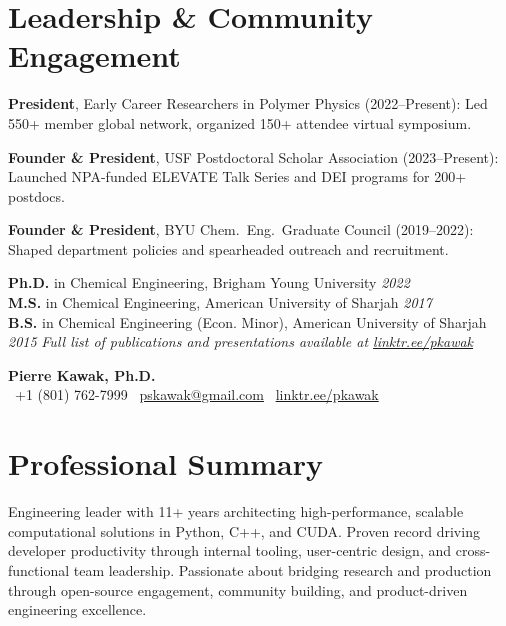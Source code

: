 \section*{Leadership \& Community Engagement}
\begin{tabitemize}[leftmargin=*]
  \item \textbf{President}, Early Career Researchers in Polymer Physics (2022–Present): Led 550+ member global network, organized 150+ attendee virtual symposium.
  \item \textbf{Founder \& President}, USF Postdoctoral Scholar Association (2023–Present): Launched NPA-funded ELEVATE Talk Series and DEI programs for 200+ postdocs.
  \item \textbf{Founder \& President}, BYU Chem.~Eng.~Graduate Council (2019–2022): Shaped department policies and spearheaded outreach and recruitment.
\end{tabitemize}
\textbf{Ph.D.} in Chemical Engineering, Brigham Young University \hfill \textit{2022} \\
\textbf{M.S.} in Chemical Engineering, American University of Sharjah \hfill \textit{2017} \\
\textbf{B.S.} in Chemical Engineering (Econ. Minor), American University of Sharjah \hfill \textit{2015}
\vspace{0.5em}
\noindent\textit{Full list of publications and presentations available at \href{https://linktr.ee/pkawak}{linktr.ee/pkawak}}

\begin{center}
  {\LARGE \textbf{Pierre Kawak, Ph.D.}}\\
  \faPhone\ +1 (801) 762-7999 \quad \faEnvelope\ \href{mailto:pskawak@gmail.com}{pskawak@gmail.com} \quad \faLink\ \href{https://linktr.ee/pkawak}{linktr.ee/pkawak}
\end{center}
\vspace{-0.3\baselineskip}
\section*{Professional Summary}
Engineering leader with 11+ years architecting high-performance, scalable computational solutions in Python, C++, and CUDA.
Proven record driving developer productivity through internal tooling, user-centric design, and cross-functional team leadership.
Passionate about bridging research and production through open-source engagement, community building, and product-driven engineering excellence.
\vspace{-0.3\baselineskip}
